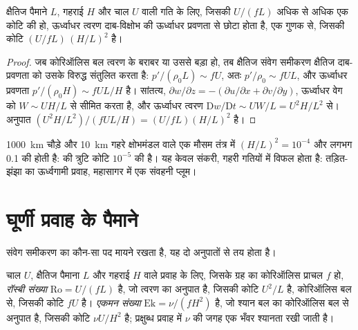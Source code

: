 \begin{proposition}\label{prop:b3:gfd-foundations:hydrostatic}
क्षैतिज पैमाने $L$, गहराई $H$ और चाल $U$ वाली गति के लिए, जिसकी
 $U/(fL)$ अधिक से अधिक एक कोटि की हो, ऊर्ध्वाधर त्वरण
दाब-विक्षोभ की ऊर्ध्वाधर प्रवणता से छोटा होता है, एक
गुणक से, जिसकी कोटि $(U/fL)\,(H/L)^2$ है।
\end{proposition}

\begin{proof}
जब कोरिऑलिस बल त्वरण के बराबर या उससे बड़ा हो, तब क्षैतिज संवेग समीकरण
क्षैतिज दाब-प्रवणता को
उसके विरुद्ध संतुलित करता है: $p'/(\rho_0 L) \sim fU$, अतः $p'/\rho_0 \sim fUL$, और ऊर्ध्वाधर
प्रवणता $p'/(\rho_0 H) \sim fUL/H$ है। सांतत्य, $\partial w/\partial z
= -(\partial u/\partial x + \partial v/\partial y)$, ऊर्ध्वाधर वेग को
$W \sim UH/L$ से सीमित करता है, और ऊर्ध्वाधर त्वरण
$\mathrm Dw/\mathrm Dt \sim UW/L = U^2H/L^2$ से। अनुपात $(U^2H/L^2)/(fUL/H)
= (U/fL)(H/L)^2$ है।
\end{proof}

\qty{1000}{km} चौड़े और \qty{10}{km} गहरे क्षोभमंडल वाले एक मौसम तंत्र में
$(H/L)^2 = 10^{-4}$ और लगभग 0.1 की  होती है:  की
त्रुटि कोटि $10^{-5}$ की है। यह केवल संकरी, गहरी गतियों में विफल होता है:
तड़ित-झंझा का ऊर्ध्वगामी प्रवाह, महासागर में एक संवहनी प्लूम।

\section{घूर्णी प्रवाह के पैमाने}\label{sec:b3:gfd-foundations:scales}

संवेग समीकरण का कौन-सा पद मायने रखता है, यह दो अनुपातों से तय होता है।

\begin{definition}[रॉस्बी और एकमन संख्याएँ]\label{def:b3:gfd-foundations:numbers}
चाल $U$, क्षैतिज पैमाना $L$ और गहराई $H$ वाले प्रवाह के लिए, जिसके ग्रह का
कोरिऑलिस प्राचल $f$ हो, \emph{रॉस्बी संख्या}
$\mathrm{Ro} = U/(fL)$ है, जो त्वरण का अनुपात है, जिसकी कोटि $U^2/L$ है,
कोरिऑलिस बल से, जिसकी कोटि $fU$ है। \emph{एकमन
संख्या} $\mathrm{Ek} = \nu/(fH^2)$ है, जो श्यान बल का
कोरिऑलिस बल से अनुपात है, जिसकी कोटि $\nu U/H^2$ है;
प्रक्षुब्ध प्रवाह में $\nu$ की जगह एक भँवर श्यानता रखी जाती है।
\end{definition}


